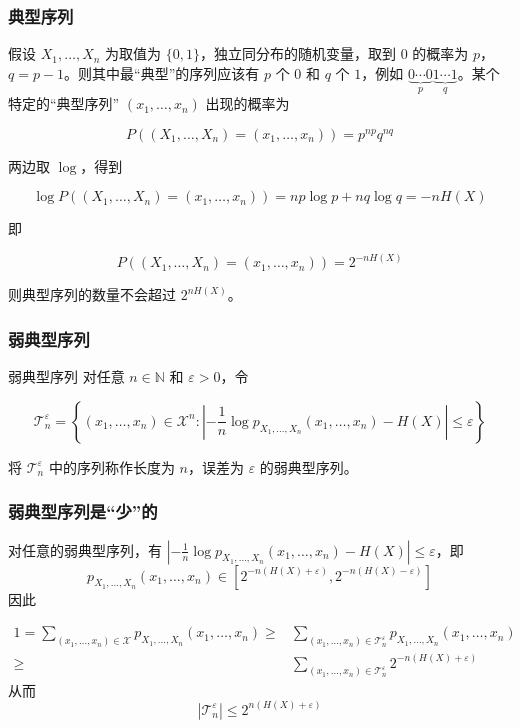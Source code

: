 \documentclass{beamer}
\begin{document}
\begin{frame}
    \frametitle{典型序列}

    假设 $X_1, \dots, X_n$ 为取值为 $\{0, 1\}$，独立同分布的随机变量，取到 $0$ 的概率为 $p$，$q = p - 1$。则其中最``典型''的序列应该有 $p$ 个 $0$ 和 $q$ 个 $1$，例如 $\underbrace{0\cdots 0}_{p} \underbrace{1\cdots 1}_{q}$。某个特定的``典型序列'' $(x_1, \dots, x_n)$ 出现的概率为

    \[P((X_1, \dots, X_n) = (x_1, \dots, x_n)) = p^{np} q^{nq}\]

    两边取 $\log$，得到

    \[\log P((X_1, \dots, X_n) = (x_1, \dots, x_n)) = np\log p + nq\log q = -nH(X)\]

    即

    \[P((X_1, \dots, X_n) = (x_1, \dots, x_n)) = 2^{-nH(X)}\]

    则典型序列的数量不会超过 $2^{nH(X)}$。

\end{frame}

\begin{frame}
    \frametitle{弱典型序列}
    
    \begin{block}{弱典型序列}
        对任意 $n\in \mathbb{N}$ 和 $\varepsilon > 0$，令

        \[\mathcal{T}_n^{\varepsilon} = \left\{(x_1, \dots, x_n) \in \mathcal{X}^n: \left\lvert-\frac{1}{n}\log p_{X_1, \dots, X_n}(x_1, \dots, x_n) - H(X)\right\rvert \leq \varepsilon\right\}\]

        将 $\mathcal{T}_n^{\varepsilon}$ 中的序列称作长度为 $n$，误差为 $\varepsilon$ 的弱典型序列。
    \end{block}

\end{frame}

\begin{frame}
    \frametitle{弱典型序列是``少''的}
    
        对任意的弱典型序列，有 $\left\lvert-\frac{1}{n}\log p_{X_1, \dots, X_n}(x_1, \dots, x_n) - H(X)\right\rvert \leq \varepsilon$，即
        \[p_{X_1, \dots, X_n}(x_1, \dots, x_n) \in \left[2^{-n(H(X)+\varepsilon)}, 2^{-n(H(X)-\varepsilon)}\right]\]
        因此

        \[\begin{split}
            1 = \sum_{(x_1, \dots, x_n)\in\mathcal{X}}p_{X_1, \dots, X_n}(x_1, \dots, x_n) \geq & \sum_{(x_1, \dots, x_n)\in\mathcal{T}_n^{\varepsilon}}p_{X_1, \dots, X_n}(x_1, \dots, x_n) \\
            \geq & \sum_{(x_1, \dots, x_n)\in\mathcal{T}_n^{\varepsilon}} 2^{-n(H(X)+\varepsilon)}
        \end{split}\]
        从而
        \[\left\lvert\mathcal{T}_n^{\varepsilon}\right\rvert \leq 2^{n(H(X) + \varepsilon)}\]

\end{frame}
\end{document}
